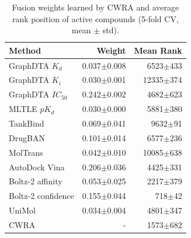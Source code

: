 \begin{table}[htbp!]
\centering
\caption{Fusion weights learned by CWRA and average rank position of active compounds (5-fold CV, mean $\pm$ std).}
\label{tab:fusion_weights_meanrank}
\small
\begin{tabular}{lrr}
\toprule
Method & Weight & Mean Rank \\
\midrule
GraphDTA $K_{d}$ & 0.037$\pm$0.008 & 6523$\pm$433 \\
GraphDTA $K_{i}$ & 0.030$\pm$0.001 & 12335$\pm$374 \\
GraphDTA $IC_{50}$ & 0.242$\pm$0.002 & 4682$\pm$623 \\
MLTLE $pK_d$ & 0.030$\pm$0.000 & 5881$\pm$380 \\
TankBind & 0.069$\pm$0.041 & 9632$\pm$91 \\
DrugBAN & 0.101$\pm$0.014 & 6577$\pm$236 \\
MolTrans & 0.042$\pm$0.010 & 10085$\pm$638 \\
AutoDock Vina & 0.206$\pm$0.036 & 4425$\pm$331 \\
Boltz-2 affinity & 0.053$\pm$0.025 & 2217$\pm$379 \\
Boltz-2 confidence & 0.155$\pm$0.044 & 718$\pm$42 \\
UniMol & 0.034$\pm$0.004 & 4801$\pm$347 \\
CWRA & - & 1573$\pm$682 \\
\bottomrule
\end{tabular}
\end{table}